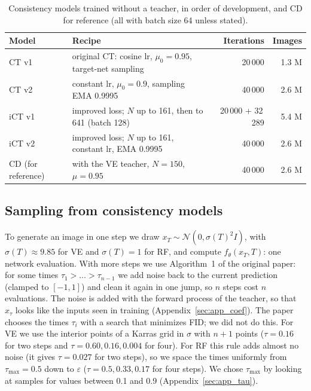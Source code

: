 \documentclass{article}
\begin{document}
\begin{table}[!htbp]
  \caption{Consistency models trained without a teacher, in order of development,
  and CD for reference (all with batch size 64 unless stated).}
  \label{tab:versions}
  \centering
  \footnotesize
  \begin{tabular}{lp{6.8cm}rr}
    \toprule
    Model & Recipe & Iterations & Images \\
    \midrule
    CT v1 & original CT: cosine lr, $\mu_0 = 0.95$, target-net sampling & 20\,000 & 1.3 M \\
    CT v2 & constant lr, $\mu_0 = 0.9$, sampling EMA 0.9995 & 40\,000 & 2.6 M \\
    iCT v1 & improved loss; $N$ up to 161, then to 641 (batch 128) & 20\,000 + 32\,289 & 5.4 M \\
    iCT v2 & improved loss; $N$ up to 161, constant lr, EMA 0.9995 & 40\,000 & 2.6 M \\
    \midrule
    CD (for reference) & with the VE teacher, $N = 150$, $\mu = 0.95$ & 40\,000 & 2.6 M \\
    \bottomrule
  \end{tabular}
\end{table}

\subsection{Sampling from consistency models}
\label{sec:sampling}

To generate an image in one step we draw $x_T \sim \mathcal{N}(0, \sigma(T)^2 I)$,
with $\sigma(T) \approx 9.85$ for VE and $\sigma(T) = 1$ for RF, and compute
$f_\theta(x_T, T)$: one network evaluation. With more steps we use Algorithm~1 of
the original paper: for some times $\tau_1 > \dots > \tau_{n-1}$ we add noise back
to the current prediction (clamped to $[-1, 1]$) and clean it again in one jump,
so $n$ steps cost $n$ evaluations. The noise is added with the forward process of
the teacher, so that $x_\tau$ looks like the inputs seen in training
(Appendix~\ref{sec:app_coef}).
The paper chooses the times $\tau_i$ with a search that minimizes FID; we did not
do this. For VE we use the interior points of a Karras grid in $\sigma$ with
$n + 1$ points ($\tau = 0.16$ for two steps and $\tau = 0.60, 0.16, 0.004$ for
four). For RF this rule adds almost no noise (it gives $\tau = 0.027$ for two
steps), so we space the times uniformly from $\tau_\text{max} = 0.5$ down to
$\varepsilon$ ($\tau = 0.5, 0.33, 0.17$ for four steps). We chose
$\tau_\text{max}$ by looking at samples for values between 0.1 and 0.9
(Appendix~\ref{sec:app_tau}).
\end{document}
